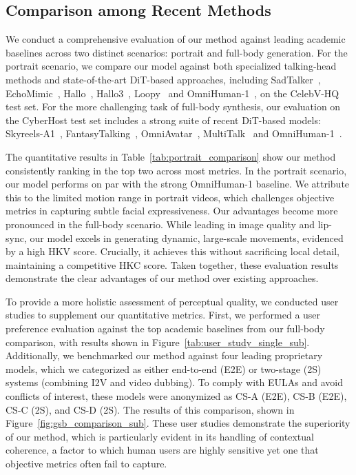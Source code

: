 \subsection{Comparison among Recent Methods}
We conduct a comprehensive evaluation of our method against leading academic baselines across two distinct scenarios: portrait and full-body generation. For the portrait scenario, we compare our model against both specialized talking-head methods and state-of-the-art DiT-based approaches, including SadTalker~\cite{zhang2023sadtalker}, EchoMimic~\cite{chen2024echomimic}, Hallo~\cite{xu2024hallo}, Hallo3~\cite{hallo3}, Loopy~\cite{jiang2025loopy} and OmniHuman-1~\cite{lin2025omnihuman}, on the CelebV-HQ test set. For the more challenging task of full-body synthesis, our evaluation on the CyberHost test set includes a strong suite of recent DiT-based models: Skyreels-A1~\cite{fei2025skyreels}, FantasyTalking~\cite{wang2025fantasytalking}, OmniAvatar~\cite{gan2025omniavatar}, MultiTalk~\cite{kong2025multitalk} and OmniHuman-1~\cite{lin2025omnihuman}.
\par
The quantitative results in Table~\ref{tab:portrait_comparison} show our method consistently ranking in the top two across most metrics. In the portrait scenario, our model performs on par with the strong OmniHuman-1 baseline. We attribute this to the limited motion range in portrait videos, which challenges objective metrics in capturing subtle facial expressiveness. Our advantages become more pronounced in the full-body scenario. While leading in image quality and lip-sync, our model excels in generating dynamic, large-scale movements, evidenced by a high HKV score. Crucially, it achieves this without sacrificing local detail, maintaining a competitive HKC score. Taken together, these evaluation results demonstrate the clear advantages of our method over existing approaches.
\par
To provide a more holistic assessment of perceptual quality, we conducted user studies to supplement our quantitative metrics. First, we performed a user preference evaluation against the top academic baselines from our full-body comparison, with results shown in Figure~\ref{tab:user_study_single_sub}.
Additionally, we benchmarked our method against four leading proprietary models, which we categorized as either end-to-end (E2E) or two-stage (2S) systems (combining I2V and video dubbing). To comply with EULAs and avoid conflicts of interest, these models were anonymized as CS-A (E2E), CS-B (E2E), CS-C (2S), and CS-D (2S). The results of this comparison, shown in Figure~\ref{fig:gsb_comparison_sub}. These user studies demonstrate the superiority of our method, which is particularly evident in its handling of contextual coherence, a factor to which human users are highly sensitive yet one that objective metrics often fail to capture.



